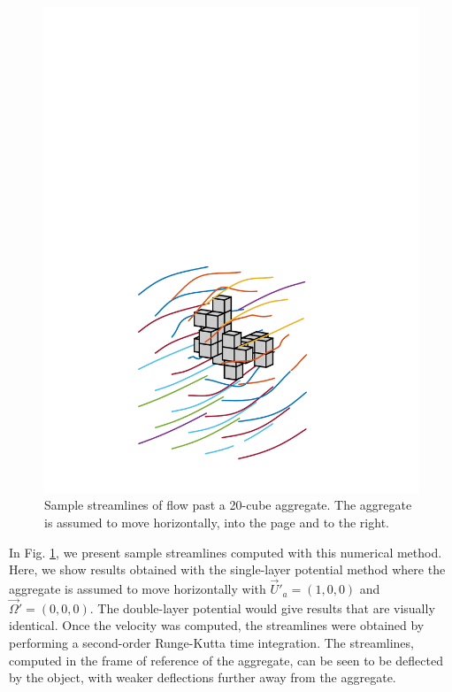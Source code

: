 \begin{figure}[ht]
	\begin{center}
	  \includegraphics[scale = 0.4]{./figures/fig_streamlines25_fig120.pdf}
	 \end{center}
	\caption{Sample streamlines of flow past a 20-cube aggregate. The aggregate is assumed to move horizontally, into the page and to the right.
	}
	\label{fig_stream}
	\end{figure}
	
	In Fig. \ref{fig_stream}, we present sample streamlines computed with this numerical method. Here, we show results obtained with the single-layer potential method where the aggregate is assumed to move horizontally with $\vec{U}'_a = (1,0,0)$ and $\vec{\Omega}' = (0,0,0)$. The double-layer potential would give results that are visually identical. Once the velocity was computed, the streamlines were obtained by performing a second-order Runge-Kutta time integration.  The streamlines, computed in the frame of reference of the aggregate, can be seen to be deflected by the object, with weaker deflections further away from the aggregate.

